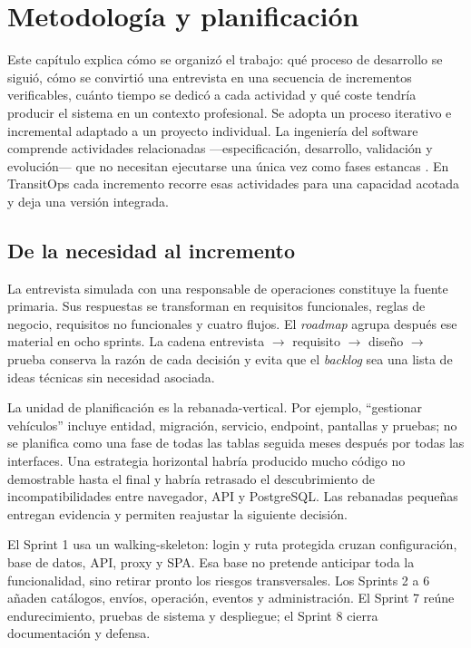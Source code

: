 \chapter{Metodología y planificación}

Este capítulo explica cómo se organizó el trabajo: qué proceso de desarrollo se siguió, cómo se convirtió una entrevista en una secuencia de incrementos verificables, cuánto tiempo se dedicó a cada actividad y qué coste tendría producir el sistema en un contexto profesional. Se adopta un proceso iterativo e incremental adaptado a un proyecto individual. La ingeniería del software comprende actividades relacionadas ---especificación, desarrollo, validación y evolución--- que no necesitan ejecutarse una única vez como fases estancas \cite{sommerville2016}. En TransitOps cada incremento recorre esas actividades para una capacidad acotada y deja una versión integrada.

\section{De la necesidad al incremento}

La entrevista simulada con una responsable de operaciones constituye la fuente primaria. Sus respuestas se transforman en requisitos funcionales, reglas de negocio, requisitos no funcionales y cuatro flujos. El \emph{roadmap} agrupa después ese material en ocho sprints. La cadena entrevista $\rightarrow$ requisito $\rightarrow$ diseño $\rightarrow$ prueba conserva la razón de cada decisión y evita que el \emph{backlog} sea una lista de ideas técnicas sin necesidad asociada.

La unidad de planificación es la \gls{rebanada-vertical}. Por ejemplo, ``gestionar vehículos'' incluye entidad, migración, servicio, endpoint, pantallas y pruebas; no se planifica como una fase de todas las tablas seguida meses después por todas las interfaces. Una estrategia horizontal habría producido mucho código no demostrable hasta el final y habría retrasado el descubrimiento de incompatibilidades entre navegador, API y PostgreSQL. Las rebanadas pequeñas entregan evidencia y permiten reajustar la siguiente decisión.

El Sprint 1 usa un \gls{walking-skeleton}: login y ruta protegida cruzan configuración, base de datos, API, proxy y SPA. Esa base no pretende anticipar toda la funcionalidad, sino retirar pronto los riesgos transversales. Los Sprints 2 a 6 añaden catálogos, envíos, operación, eventos y administración. El Sprint 7 reúne endurecimiento, pruebas de sistema y despliegue; el Sprint 8 cierra documentación y defensa.

